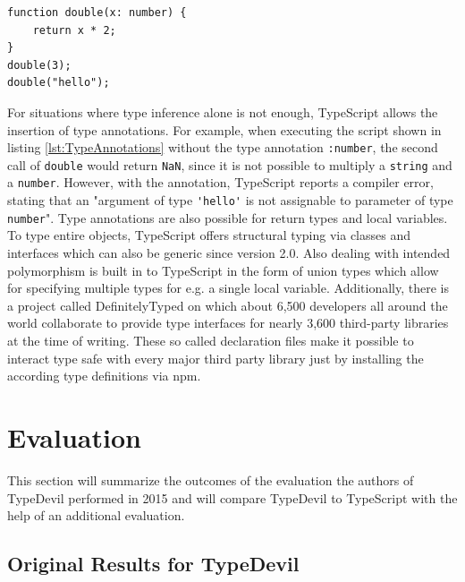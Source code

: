 \documentclass[runningheads,a4paper]{llncs}
\begin{document}
\medskip\medskip
\lstset{language=javascript}
\begin{minipage}{\linewidth}
\begin{lstlisting}[frame=single, caption=Type Annotations, label={lst:TypeAnnotations}]
function double(x: number) {
    return x * 2;
}
double(3);
double("hello");
\end{lstlisting}
\end{minipage}
For situations where type inference alone is not enough, TypeScript allows the insertion of type annotations.
For example, when executing the script shown in listing \ref{lst:TypeAnnotations} without the type annotation \lstinline[columns=fixed]{:number}, the second call of \lstinline[columns=fixed]{double} would return \lstinline[columns=fixed]{NaN}, since it is not possible to multiply a \lstinline[columns=fixed]{string} and a \lstinline[columns=fixed]{number}.
However, with the annotation, TypeScript reports a compiler error, stating that an "argument of type \lstinline[columns=fixed]{'hello'} is not assignable to parameter of type \lstinline[columns=fixed]{number}".
Type annotations are also possible for return types and local variables.
To type entire objects, TypeScript offers structural typing via classes and interfaces which can also be generic since version 2.0.
Also dealing with intended polymorphism is built in to TypeScript in the form of union types which allow for specifying multiple types for e.g. a single local variable.
Additionally, there is a project called DefinitelyTyped \cite{DefinitelyTyped} on which about 6,500 developers all around the world collaborate to provide type interfaces for nearly 3,600 third-party libraries at the time of writing.
These so called declaration files make it possible to interact type safe with every major third party library just by installing the according type definitions via npm.

\section{Evaluation}

This section will summarize the outcomes of the evaluation the authors of TypeDevil performed in 2015 and will compare TypeDevil to TypeScript with the help of an additional evaluation.

\subsection{Original Results for TypeDevil}
\end{document}
